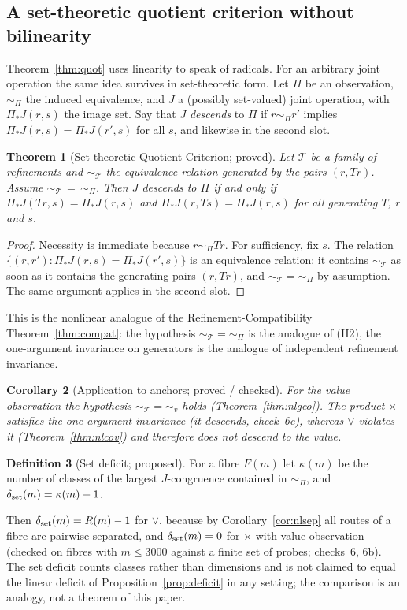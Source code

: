\documentclass[11pt,a4paper]{article}
\newcommand{\defic}{\delta}
\newcommand{\vj}{\mathbin{\vee}}
\theoremstyle{plain}
\newtheorem{theorem}{Theorem}[section]
\newtheorem{corollary}[theorem]{Corollary}
\theoremstyle{definition}
\newtheorem{definition}[theorem]{Definition}
\begin{document}
\subsection{A set-theoretic quotient criterion without bilinearity}\label{sec:nlquot}
Theorem~\ref{thm:quot} uses linearity to speak of radicals. For an arbitrary joint operation the same idea survives in set-theoretic form. Let $\Pi$ be an observation, $\sim_\Pi$ the induced equivalence, and $J$ a (possibly set-valued) joint operation, with $\Pi_*J(r,s)$ the image set. Say that $J$ \emph{descends} to $\Pi$ if $r\sim_\Pi r'$ implies $\Pi_*J(r,s)=\Pi_*J(r',s)$ for all $s$, and likewise in the second slot.

\begin{theorem}[Set-theoretic Quotient Criterion; proved]\label{thm:nlsetq}
Let $\mathcal T$ be a family of refinements and $\sim_{\mathcal T}$ the equivalence relation generated by the pairs $(r,Tr)$. Assume $\sim_{\mathcal T}\,=\,\sim_\Pi$. Then $J$ descends to $\Pi$ if and only if $\Pi_*J(Tr,s)=\Pi_*J(r,s)$ and $\Pi_*J(r,Ts)=\Pi_*J(r,s)$ for all generating $T$, $r$ and $s$.
\end{theorem}
\begin{proof}
Necessity is immediate because $r\sim_\Pi Tr$. For sufficiency, fix $s$. The relation $\{(r,r'):\Pi_*J(r,s)=\Pi_*J(r',s)\}$ is an equivalence relation; it contains $\sim_{\mathcal T}$ as soon as it contains the generating pairs $(r,Tr)$, and $\sim_{\mathcal T}=\sim_\Pi$ by assumption. The same argument applies in the second slot.
\end{proof}
This is the nonlinear analogue of the Refinement-Compatibility Theorem~\ref{thm:compat}: the hypothesis $\sim_{\mathcal T}=\sim_\Pi$ is the analogue of (H2), the one-argument invariance on generators is the analogue of independent refinement invariance.

\begin{corollary}[Application to anchors; proved / checked]\label{cor:nlapp}
For the value observation the hypothesis $\sim_{\mathcal T}=\sim_{v}$ holds (Theorem~\ref{thm:nlgeo}). The product $\times$ satisfies the one-argument invariance (it descends,  check~6c), whereas $\vj$ violates it (Theorem~\ref{thm:nlcov}) and therefore does not descend to the value.
\end{corollary}

\begin{definition}[Set deficit; proposed]\label{def:nlsetdef}
For a fibre $F(m)$ let $\kappa(m)$ be the number of classes of the largest $J$-congruence contained in $\sim_\Pi$, and $\defic_{\rm set}(m)=\kappa(m)-1$.
\end{definition}
\noindent Then $\defic_{\rm set}(m)=R(m)-1$ for $\vj$, because by Corollary~\ref{cor:nlsep} all routes of a fibre are pairwise separated, and $\defic_{\rm set}(m)=0$ for $\times$ with value observation (checked on fibres with $m\le3000$ against a finite set of probes;  checks~6, 6b). The set deficit counts classes rather than dimensions and is not claimed to equal the linear deficit of Proposition~\ref{prop:deficit} in any setting; the comparison is an analogy, not a theorem of this paper.
\end{document}
